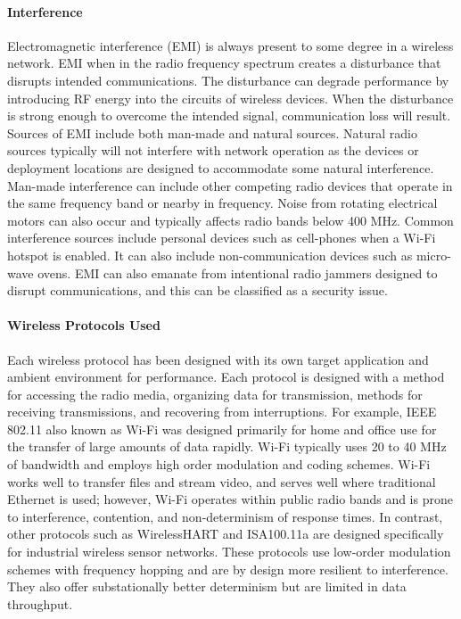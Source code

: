 {\paragraph{Interference} Electromagnetic interference (EMI) is always present to some degree in a wireless network.  EMI when in the radio frequency spectrum creates a disturbance that disrupts intended communications.  The disturbance can degrade performance by introducing RF energy into the circuits of wireless devices.  When the disturbance is strong enough to overcome the intended signal, communication loss will result.  Sources of EMI include both man-made and natural sources.  Natural radio sources typically will not interfere with network operation as the devices or deployment locations are designed to accommodate some natural interference.  Man-made interference can include other competing radio devices that operate in the same frequency band or nearby in frequency.  Noise from rotating electrical motors can also occur and typically affects radio bands below 400 MHz.  Common interference sources include personal devices such as cell-phones when a Wi-Fi hotspot is enabled.  It can also include non-communication devices such as micro-wave ovens.  EMI can also emanate from intentional radio jammers designed to disrupt communications, and this can be classified as a security issue.

\paragraph{Wireless Protocols Used} Each wireless protocol has been designed with its own target application and ambient environment for performance.  Each protocol is designed with a method for accessing the radio media, organizing data for transmission, methods for receiving transmissions, and recovering from interruptions.   For example, IEEE 802.11 also known as Wi-Fi was designed primarily for home and office use for the transfer of large amounts of data rapidly.  Wi-Fi typically uses 20 to 40 MHz of bandwidth and employs high order modulation and coding schemes.  Wi-Fi works well to transfer files and stream video, and serves well where traditional Ethernet is used; however, Wi-Fi operates within public radio bands and is prone to interference, contention, and non-determinism of response times.  In contrast, other protocols such as WirelessHART and ISA100.11a are designed specifically for industrial wireless sensor networks.  These protocols use low-order modulation schemes with frequency hopping and are by design more resilient to interference.  They also offer substationally better determinism but are limited in data throughput.

}
